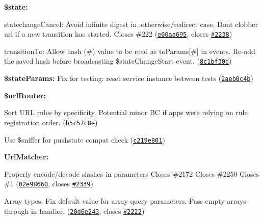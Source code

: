 {\bfseries {\bfseries 
\begin{DoxyItemize}
\item {\bfseries \$state\+:}
\begin{DoxyItemize}
\item statechange\+Cancel\+: Avoid infinite digest in .otherwise/redirect case. Don\textquotesingle{}t clobber url if a new transition has started. Closes \#222 (\href{https://github.com/angular-ui/ui-router/commit/e00aa695e41ddc5ebd5d2b226aa0917a751b11aa}{\tt e00aa695}, closes \href{https://github.com/angular-ui/ui-router/issues/2238}{\tt \#2238})
\item transition\+To\+: Allow hash (\#) value to be read as to\+Params\mbox{[}\textquotesingle{}\#\textquotesingle{}\mbox{]} in events. Re-\/add the saved hash before broadcasting \$state\+Change\+Start event. (\href{https://github.com/angular-ui/ui-router/commit/8c1bf30d2a3b78ba40b330f12d854c885d6cc117}{\tt 8c1bf30d})
\end{DoxyItemize}
\item {\bfseries \$state\+Params\+:} Fix for testing\+: reset service instance between tests (\href{https://github.com/angular-ui/ui-router/commit/2aeb0c4b205baf6cfa2ef25bb986bb160dc13bf9}{\tt 2aeb0c4b})
\item {\bfseries \$url\+Router\+:}
\begin{DoxyItemize}
\item Sort U\+RL rules by specificity. Potential minor BC if apps were relying on rule registration order. (\href{https://github.com/angular-ui/ui-router/commit/b5c57c8ec2e14e17e75104c1424654f126ea4011}{\tt b5c57c8e})
\item Use \$sniffer for pushstate compat check (\href{https://github.com/angular-ui/ui-router/commit/c219e801797f340ef9c5c919ab890ef003a7a042}{\tt c219e801})
\end{DoxyItemize}
\item {\bfseries Url\+Matcher\+:}
\begin{DoxyItemize}
\item Properly encode/decode slashes in parameters Closes \#2172 Closes \#2250 Closes \#1 (\href{https://github.com/angular-ui/ui-router/commit/02e98660a80dfd1ca4b113dd24ee304af91e9f8c}{\tt 02e98660}, closes \href{https://github.com/angular-ui/ui-router/issues/2339}{\tt \#2339})
\item Array types\+: Fix default value for array query parameters. Pass empty arrays through in handler. (\href{https://github.com/angular-ui/ui-router/commit/20d6e243f1745ddbf257217245a1dc22eabe13da}{\tt 20d6e243}, closes \href{https://github.com/angular-ui/ui-router/issues/2222}{\tt \#2222})

\end{DoxyItemize}
\end{DoxyItemize}}}

